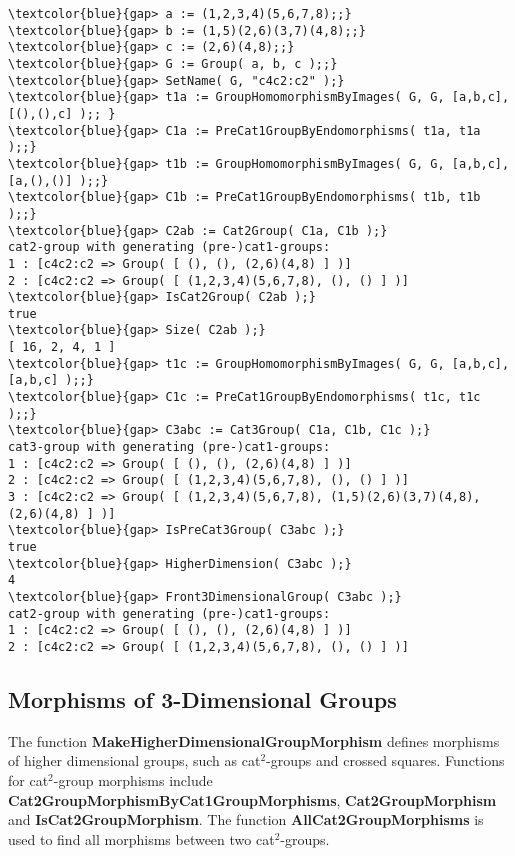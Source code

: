 \documentclass[a4paper,11pt]{article}
\theoremstyle{plain}
\theoremstyle{definition}
\begin{document}
\begin{Verbatim}[frame=single, fontsize=\small, commandchars=\\\{\}]
\textcolor{blue}{gap> a := (1,2,3,4)(5,6,7,8);;}
\textcolor{blue}{gap> b := (1,5)(2,6)(3,7)(4,8);;}
\textcolor{blue}{gap> c := (2,6)(4,8);;}
\textcolor{blue}{gap> G := Group( a, b, c );;}
\textcolor{blue}{gap> SetName( G, "c4c2:c2" );}
\textcolor{blue}{gap> t1a := GroupHomomorphismByImages( G, G, [a,b,c], [(),(),c] );; }
\textcolor{blue}{gap> C1a := PreCat1GroupByEndomorphisms( t1a, t1a );;}
\textcolor{blue}{gap> t1b := GroupHomomorphismByImages( G, G, [a,b,c], [a,(),()] );;}
\textcolor{blue}{gap> C1b := PreCat1GroupByEndomorphisms( t1b, t1b );;}
\textcolor{blue}{gap> C2ab := Cat2Group( C1a, C1b );}
cat2-group with generating (pre-)cat1-groups:
1 : [c4c2:c2 => Group( [ (), (), (2,6)(4,8) ] )]
2 : [c4c2:c2 => Group( [ (1,2,3,4)(5,6,7,8), (), () ] )]
\textcolor{blue}{gap> IsCat2Group( C2ab );}
true
\textcolor{blue}{gap> Size( C2ab );}
[ 16, 2, 4, 1 ]
\textcolor{blue}{gap> t1c := GroupHomomorphismByImages( G, G, [a,b,c], [a,b,c] );;}
\textcolor{blue}{gap> C1c := PreCat1GroupByEndomorphisms( t1c, t1c );;}
\textcolor{blue}{gap> C3abc := Cat3Group( C1a, C1b, C1c );}
cat3-group with generating (pre-)cat1-groups:
1 : [c4c2:c2 => Group( [ (), (), (2,6)(4,8) ] )]
2 : [c4c2:c2 => Group( [ (1,2,3,4)(5,6,7,8), (), () ] )]
3 : [c4c2:c2 => Group( [ (1,2,3,4)(5,6,7,8), (1,5)(2,6)(3,7)(4,8),
(2,6)(4,8) ] )]
\textcolor{blue}{gap> IsPreCat3Group( C3abc );}
true
\textcolor{blue}{gap> HigherDimension( C3abc );}
4
\textcolor{blue}{gap> Front3DimensionalGroup( C3abc );} 
cat2-group with generating (pre-)cat1-groups:
1 : [c4c2:c2 => Group( [ (), (), (2,6)(4,8) ] )]
2 : [c4c2:c2 => Group( [ (1,2,3,4)(5,6,7,8), (), () ] )]
\end{Verbatim}

\subsection{Morphisms of 3-Dimensional Groups}

The function \textbf{MakeHigherDimensionalGroupMorphism} defines morphisms of 
higher dimensional groups, such as cat$^{2}$-groups and crossed squares. 
Functions for cat$^{2}$-group morphisms include 
\textbf{Cat2GroupMorphismByCat1GroupMorphisms}, \textbf{Cat2GroupMorphism} and 
\textbf{IsCat2GroupMorphism}. 
The function \textbf{AllCat2GroupMorphisms} is used to find 
all morphisms between two cat$^{2}$-groups.
\end{document}
